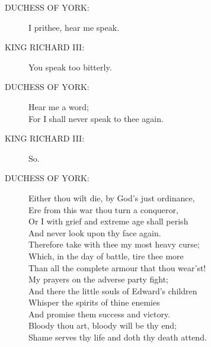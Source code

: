 \documentclass{article}
\begin{document}
\begin{description}
\item[DUCHESS OF YORK:] 
\hspace{1pt}I prithee, hear me speak.\\
\end{description}
\begin{description}
\item[KING RICHARD III:] 
\hspace{1pt}You speak too bitterly.\\
\end{description}
\begin{description}
\item[DUCHESS OF YORK:] 
\hspace{1pt}Hear me a word;\\
\hspace{1pt}For I shall never speak to thee again.\\
\end{description}
\begin{description}
\item[KING RICHARD III:] 
\hspace{1pt}So.\\
\end{description}
\begin{description}
\item[DUCHESS OF YORK:] 
\hspace{1pt}Either thou wilt die, by God's just ordinance,\\
\hspace{1pt}Ere from this war thou turn a conqueror,\\
\hspace{1pt}Or I with grief and extreme age shall perish\\
\hspace{1pt}And never look upon thy face again.\\
\hspace{1pt}Therefore take with thee my most heavy curse;\\
\hspace{1pt}Which, in the day of battle, tire thee more\\
\hspace{1pt}Than all the complete armour that thou wear'st!\\
\hspace{1pt}My prayers on the adverse party fight;\\
\hspace{1pt}And there the little souls of Edward's children\\
\hspace{1pt}Whisper the spirits of thine enemies\\
\hspace{1pt}And promise them success and victory.\\
\hspace{1pt}Bloody thou art, bloody will be thy end;\\
\hspace{1pt}Shame serves thy life and doth thy death attend.\\
\end{description}
\end{document}

